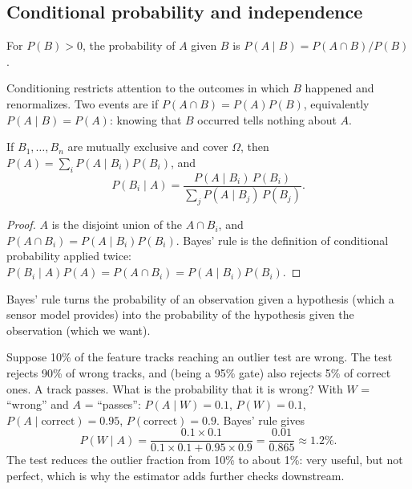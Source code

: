 \subsection{Conditional probability and independence}

\begin{definition}
For $P(B) > 0$, the probability of $A$ given $B$ is $P(A\mid B) = P(A\cap B)/P(B)$.
\end{definition}

Conditioning restricts attention to the outcomes in which $B$ happened and renormalizes. Two events are  if
$P(A\cap B) = P(A)P(B)$, equivalently $P(A\mid B) = P(A)$: knowing that $B$ occurred tells nothing about $A$.

\begin{proposition}
If $B_1, \dots, B_n$ are mutually exclusive and cover $\Omega$, then $P(A) = \sum_iP(A\mid B_i)P(B_i)$, and
\begin{equation}
  P(B_i\mid A) = \frac{P(A\mid B_i)\,P(B_i)}{\sum_jP(A\mid B_j)\,P(B_j)} .
\end{equation}
\end{proposition}
\begin{proof}
$A$ is the disjoint union of the $A\cap B_i$, and $P(A\cap B_i) = P(A\mid B_i)P(B_i)$. Bayes' rule is the definition of conditional
probability applied twice: $P(B_i\mid A)P(A) = P(A\cap B_i) = P(A\mid B_i)P(B_i)$.
\end{proof}

Bayes' rule turns the probability of an observation given a hypothesis (which a sensor model provides) into the probability of the
hypothesis given the observation (which we want).

\begin{worked}
Suppose 10\% of the feature tracks reaching an outlier test are wrong. The test rejects 90\% of wrong tracks, and (being a 95\% gate)
also rejects 5\% of correct ones. A track passes. What is the probability that it is wrong? With $W$ = ``wrong'' and $A$ = ``passes'':
$P(A\mid W) = 0.1$, $P(W) = 0.1$, $P(A\mid\text{correct}) = 0.95$, $P(\text{correct}) = 0.9$. Bayes' rule gives
\begin{equation*}
  P(W\mid A) = \frac{0.1\times0.1}{0.1\times0.1 + 0.95\times0.9} = \frac{0.01}{0.865} \approx 1.2\% .
\end{equation*}
The test reduces the outlier fraction from 10\% to about 1\%: very useful, but not perfect, which is why the estimator adds further
checks downstream.
\end{worked}

